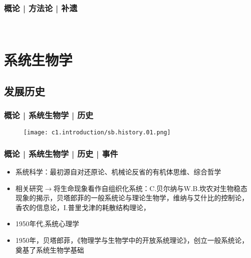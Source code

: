 \begin{frame}
  \frametitle{概论 | 方法论 | 补遗}
  \begin{figure}
    \centering
    \qquad
    \\
    \vspace{1em}
  \end{figure}
\end{frame}

\section{系统生物学}
\subsection{发展历史}
\begin{frame}
  \frametitle{概论 | 系统生物学 | 历史}
  \begin{figure}
    \centering
    \texttt{[image: c1.introduction/sb.history.01.png]}
  \end{figure}
\end{frame}

\begin{frame}
  \frametitle{概论 | 系统生物学 | 历史 | 事件}
  \begin{itemize}
    \item 系统科学：最初源自对还原论、机械论反省的有机体思维、综合哲学
    \item 相关研究$\rightarrow$将生命现象看作自组织化系统：C.贝尔纳与W.B.坎农对生物稳态现象的揭示，贝塔郎菲的一般系统论与理论生物学，维纳与艾什比的控制论，香农的信息论，I.普里戈津的耗散结构理论，
    \item 1950年代,系统心理学
    \item 1950年，贝塔郎菲，《物理学与生物学中的开放系统理论》，创立一般系统论，奠基了系统生物学基础
  \end{itemize}
\end{frame}

